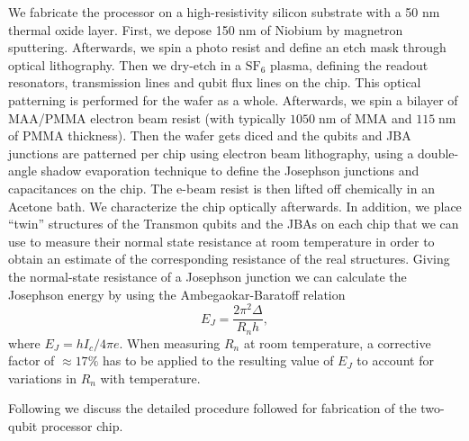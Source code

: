 We fabricate the processor on a high-resistivity silicon substrate with a 50 nm thermal oxide layer. First, we depose 150 nm of Niobium by magnetron sputtering. Afterwards, we spin a photo resist and define an etch mask through optical lithography. Then we dry-etch in a $\mathrm{SF}_6$ plasma, defining the readout resonators, transmission lines and qubit flux lines on the chip. This optical patterning is performed for the wafer as a whole. Afterwards, we spin a bilayer of MAA/PMMA electron beam resist (with typically $1050\;\mathrm{nm}$ of MMA and $115\;\mathrm{nm}$ of PMMA thickness). Then the wafer gets diced and the qubits and JBA junctions are patterned per chip using electron beam lithography, using a double-angle shadow evaporation technique to define the Josephson junctions and capacitances on the chip. The e-beam resist is then lifted off chemically in an Acetone bath. We characterize the chip optically afterwards. In addition, we place ``twin'' structures of the Transmon qubits and the JBAs on each chip that we can use to measure their normal state resistance at room temperature in order to obtain an estimate of the corresponding resistance of the real structures. Giving the normal-state resistance of a Josephson junction we can calculate the Josephson energy by using the Ambegaokar-Baratoff relation
%
\begin{equation}
E_J = \frac{2\pi^2 \Delta}{R_n h},
\end{equation}
%
where $E_J = h I_c / 4\pi e$. When measuring $R_n$ at room temperature, a corrective factor of $\approx 17\%$ has to be applied to the resulting value of $E_J$ to account for variations in $R_n$ with temperature. 

\smallskip

Following we discuss the detailed procedure followed for fabrication of the two-qubit processor chip.


